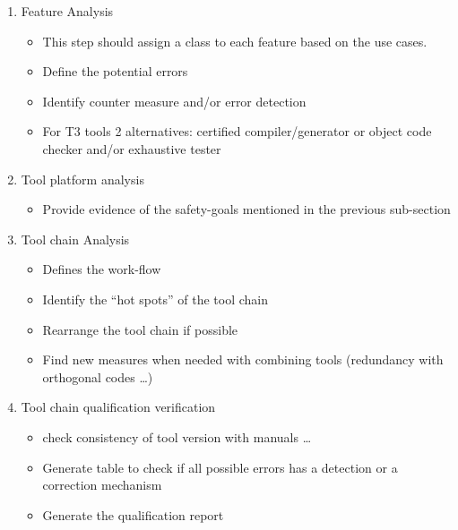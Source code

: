 \documentclass{openetcs_report}
\begin{document}
\begin{enumerate}
\item Feature Analysis
  \begin{itemize}
  \item This step should assign a class to each feature based on the use cases.
  \item Define the potential errors
  \item Identify counter measure and/or error detection
  \item For T3 tools 2 alternatives:  certified compiler/generator or
    object code checker and/or exhaustive tester
  \end{itemize}
\item Tool platform  analysis 
  \begin{itemize}
  \item Provide evidence of the safety-goals mentioned in the
    previous sub-section
  \end{itemize}
\item Tool chain Analysis
  \begin{itemize}
  \item Defines the work-flow
  \item Identify the ``hot spots'' of the tool chain
  \item Rearrange the tool chain if possible
  \item Find new measures when needed with combining tools (redundancy with orthogonal
    codes \ldots{})
  \end{itemize}
\item Tool chain qualification verification 
  \begin{itemize}
  \item check consistency of tool version with  manuals \ldots{}
  \item Generate table to  check if all possible errors has a
    detection or a correction mechanism
\item Generate the qualification report
  \end{itemize}

\end{enumerate}



\end{document}
